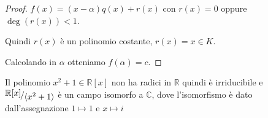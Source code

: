 \documentclass[../main.tex]{subfiles}
\begin{document}
\begin{proof}
    $f(x) = (x - \alpha) q(x) + r(x)$ con $r(x) = 0$ oppure $\deg(r(x)) < 1$.

    Quindi $r(x)$ è un polinomio costante, $r(x) = x \in K$.

    Calcolando in $\alpha$ otteniamo $f(\alpha) = c$.
\end{proof}

\begin{example}
    Il polinomio $x^2 + 1 \in \mathbb{R}[x]$ non ha radici in $\mathbb{R}$ quindi è irriducibile e $\nicefrac{\mathbb{R}[x]}{\langle x^2 + 1\rangle}$ è un campo isomorfo a $\mathbb{C}$, dove l'isomorfismo è dato dall'assegnazione $1 \mapsto 1$ e $x \mapsto i$
\end{example}
\end{document}
